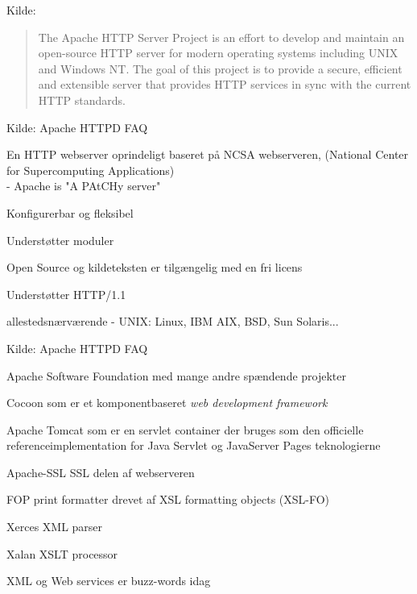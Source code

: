 Kilde: 



\begin{quote}
The Apache HTTP Server Project is an effort to develop and maintain an
open-source HTTP server for modern operating systems including UNIX
and Windows NT. The goal of this project is to provide a secure,
efficient and extensible server that provides HTTP services in sync
with the current HTTP standards.   
\end{quote}

Kilde: Apache HTTPD FAQ 



\begin{list1}
\item En HTTP webserver oprindeligt baseret på NCSA webserveren,
(National Center for Supercomputing Applications)\\
- Apache is "A PAtCHy server" 
\item Konfigurerbar og fleksibel
\item Understøtter moduler
\item Open Source og kildeteksten er tilgængelig med en fri licens
\item Understøtter HTTP/1.1
\item allestedsnærværende - UNIX: Linux, IBM AIX, BSD, Sun Solaris...
\end{list1}

Kilde: Apache HTTPD FAQ 

\begin{list1}
\item Apache Software Foundation med mange andre spændende projekter
\begin{list2}
\item Cocoon som er et komponentbaseret \emph{web development framework} 
\item Apache Tomcat som er en servlet container der bruges som den officielle
referenceimplementation for Java Servlet og JavaServer Pages
teknologierne
\item Apache-SSL SSL delen af webserveren
\item FOP print formatter drevet af XSL formatting objects (XSL-FO)
\item Xerces XML parser
\item Xalan XSLT processor
\end{list2}
\item XML og Web services er buzz-words idag
\end{list1}


